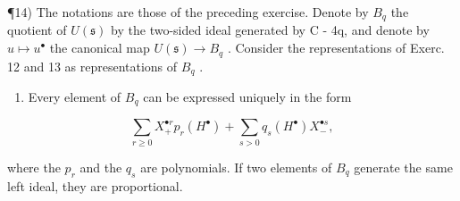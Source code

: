 ¶14) The notations are those of the preceding exercise. Denote by \(B_{q}\) the quotient of \(U(\mathfrak{s})\) by the two-sided ideal generated by C - 4q, and denote by \(u \mapsto u^{\bullet}\) the canonical map \(U(\mathfrak{s}) \to B_{q}\) . Consider the representations of Exerc. 12 and 13 as representations of \(B_{q}\) .

\begin{enumerate}
\def\labelenumi{\alph{enumi})}
\tightlist
\item
  Every element of \(B_{q}\) can be expressed uniquely in the form
\end{enumerate}

\[
\sum_ {r \geq 0} X _ {+} ^ {\bullet r} p _ {r} (H ^ {\bullet}) + \sum_ {s > 0} q _ {s} (H ^ {\bullet}) X _ {-} ^ {\bullet s},
\]

where the \(p_{r}\) and the \(q_{s}\) are polynomials. If two elements of \(B_{q}\) generate the same left ideal, they are proportional.

